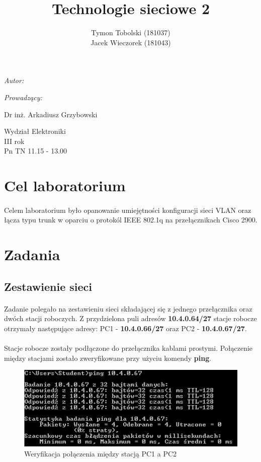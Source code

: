 \documentclass[wide,a4paper,titlepage,12pt] {article}
\title{Technologie sieciowe 2}
\author{Tymon Tobolski (181037)\\ Jacek Wieczorek (181043)}
\makeatletter
\renewcommand{\maketitle}{
\begin{titlepage}
  \begin{center}
    \vspace*{3cm}
    \LARGE \@title \par
    \vspace{2cm}
    \textit{\small Autor:}\par
    \normalsize \@author\par \normalsize
    \vspace{3cm}
    \textit{\small Prowadzący:}\par
    Dr inż. Arkadiusz Grzybowski\par
    \vspace{2cm}
    Wydział Elektroniki\\ III rok\\ Pn TN 11.15 - 13.00\par
    \vspace{4cm}
    \small \@date
  \end{center}
\end{titlepage}
}
\makeatother
\begin{document}
\maketitle
  \section{Cel laboratorium}
  \paragraph{}
  Celem laboratorium było opanowanie umiejętności konfiguracji sieci VLAN oraz łącza typu trunk w oparciu o protokól IEEE 802.1q na przełącznikach Cisco 2900.

  \section{Zadania}

  \subsection{Zestawienie sieci}
  \paragraph{}
  Zadanie polegało na zestawieniu sieci składającej się z jednego przełącznika oraz dwóch stacji roboczych.
  Z przydzielona puli adresów \textbf{10.4.0.64/27} stacje robocze otrzymały następujące adresy: PC1 - \textbf{10.4.0.66/27} oraz PC2 - \textbf{10.4.0.67/27}.
  \paragraph{}
  Stacje robocze zostały podłączone do przełącznika kablami prostymi.
  Połączenie między stacjami zostało zweryfikowane przy użyciu komendy \textbf{ping}.

  \begin{figure}[H]
    \begin{center}
      \includegraphics[width=\textwidth]{img/j1.PNG}
      \caption{Weryfikacja połączenia między stacją PC1 a PC2}
    \end{center}
  \end{figure}
\end{document}
